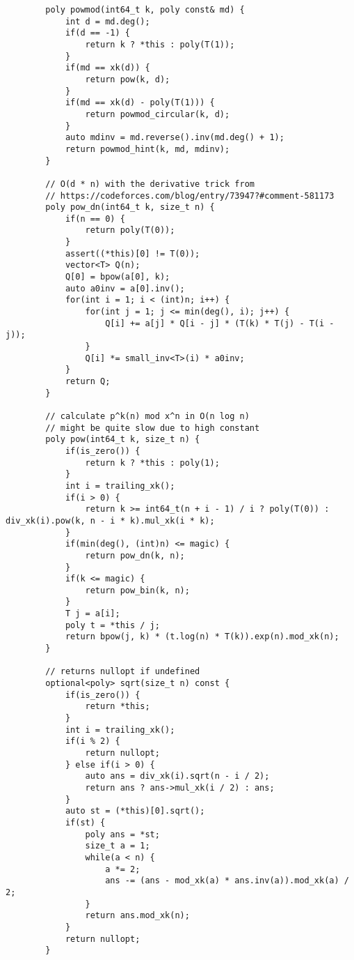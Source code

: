 \begin{lstlisting}
        poly powmod(int64_t k, poly const& md) {
            int d = md.deg();
            if(d == -1) {
                return k ? *this : poly(T(1));
            }
            if(md == xk(d)) {
                return pow(k, d);
            }
            if(md == xk(d) - poly(T(1))) {
                return powmod_circular(k, d);
            }
            auto mdinv = md.reverse().inv(md.deg() + 1);
            return powmod_hint(k, md, mdinv);
        }
        
        // O(d * n) with the derivative trick from
        // https://codeforces.com/blog/entry/73947?#comment-581173
        poly pow_dn(int64_t k, size_t n) {
            if(n == 0) {
                return poly(T(0));
            }
            assert((*this)[0] != T(0));
            vector<T> Q(n);
            Q[0] = bpow(a[0], k);
            auto a0inv = a[0].inv();
            for(int i = 1; i < (int)n; i++) {
                for(int j = 1; j <= min(deg(), i); j++) {
                    Q[i] += a[j] * Q[i - j] * (T(k) * T(j) - T(i - j));
                }
                Q[i] *= small_inv<T>(i) * a0inv;
            }
            return Q;
        }
        
        // calculate p^k(n) mod x^n in O(n log n)
        // might be quite slow due to high constant
        poly pow(int64_t k, size_t n) {
            if(is_zero()) {
                return k ? *this : poly(1);
            }
            int i = trailing_xk();
            if(i > 0) {
                return k >= int64_t(n + i - 1) / i ? poly(T(0)) : div_xk(i).pow(k, n - i * k).mul_xk(i * k);
            }
            if(min(deg(), (int)n) <= magic) {
                return pow_dn(k, n);
            }
            if(k <= magic) {
                return pow_bin(k, n);
            }
            T j = a[i];
            poly t = *this / j;
            return bpow(j, k) * (t.log(n) * T(k)).exp(n).mod_xk(n);
        }
        
        // returns nullopt if undefined
        optional<poly> sqrt(size_t n) const {
            if(is_zero()) {
                return *this;
            }
            int i = trailing_xk();
            if(i % 2) {
                return nullopt;
            } else if(i > 0) {
                auto ans = div_xk(i).sqrt(n - i / 2);
                return ans ? ans->mul_xk(i / 2) : ans;
            }
            auto st = (*this)[0].sqrt();
            if(st) {
                poly ans = *st;
                size_t a = 1;
                while(a < n) {
                    a *= 2;
                    ans -= (ans - mod_xk(a) * ans.inv(a)).mod_xk(a) / 2;
                }
                return ans.mod_xk(n);
            }
            return nullopt;
        }
        

\end{lstlisting}
